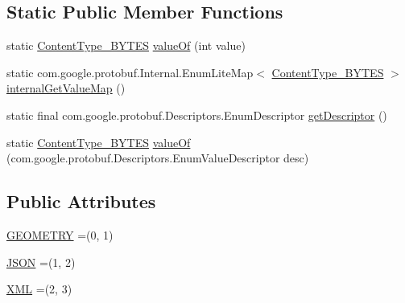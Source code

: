 \subsection*{Static Public Member Functions}
\begin{DoxyCompactItemize}
\item 
static \mbox{\hyperlink{enumcom_1_1mysql_1_1cj_1_1x_1_1protobuf_1_1_mysqlx_resultset_1_1_content_type___b_y_t_e_s}{Content\+Type\+\_\+\+B\+Y\+T\+ES}} \mbox{\hyperlink{enumcom_1_1mysql_1_1cj_1_1x_1_1protobuf_1_1_mysqlx_resultset_1_1_content_type___b_y_t_e_s_af038bca794f2bdff11aea0b8cc925e75}{value\+Of}} (int value)
\item 
static com.\+google.\+protobuf.\+Internal.\+Enum\+Lite\+Map$<$ \mbox{\hyperlink{enumcom_1_1mysql_1_1cj_1_1x_1_1protobuf_1_1_mysqlx_resultset_1_1_content_type___b_y_t_e_s}{Content\+Type\+\_\+\+B\+Y\+T\+ES}} $>$ \mbox{\hyperlink{enumcom_1_1mysql_1_1cj_1_1x_1_1protobuf_1_1_mysqlx_resultset_1_1_content_type___b_y_t_e_s_afd9ec08687cc30b3162eea70faeea54e}{internal\+Get\+Value\+Map}} ()
\item 
static final com.\+google.\+protobuf.\+Descriptors.\+Enum\+Descriptor \mbox{\hyperlink{enumcom_1_1mysql_1_1cj_1_1x_1_1protobuf_1_1_mysqlx_resultset_1_1_content_type___b_y_t_e_s_a6fb51ec8d254769046b5e081c562aed3}{get\+Descriptor}} ()
\item 
static \mbox{\hyperlink{enumcom_1_1mysql_1_1cj_1_1x_1_1protobuf_1_1_mysqlx_resultset_1_1_content_type___b_y_t_e_s}{Content\+Type\+\_\+\+B\+Y\+T\+ES}} \mbox{\hyperlink{enumcom_1_1mysql_1_1cj_1_1x_1_1protobuf_1_1_mysqlx_resultset_1_1_content_type___b_y_t_e_s_a1835fa3047f486fab6c10b4bfefaa070}{value\+Of}} (com.\+google.\+protobuf.\+Descriptors.\+Enum\+Value\+Descriptor desc)
\end{DoxyCompactItemize}
\subsection*{Public Attributes}
\begin{DoxyCompactItemize}
\item 
\mbox{\hyperlink{enumcom_1_1mysql_1_1cj_1_1x_1_1protobuf_1_1_mysqlx_resultset_1_1_content_type___b_y_t_e_s_a2f05973734af4ee7e389c32aa11c9a90}{G\+E\+O\+M\+E\+T\+RY}} =(0, 1)
\item 
\mbox{\hyperlink{enumcom_1_1mysql_1_1cj_1_1x_1_1protobuf_1_1_mysqlx_resultset_1_1_content_type___b_y_t_e_s_a3568694876b4e121a253985b374f1f88}{J\+S\+ON}} =(1, 2)
\item 
\mbox{\hyperlink{enumcom_1_1mysql_1_1cj_1_1x_1_1protobuf_1_1_mysqlx_resultset_1_1_content_type___b_y_t_e_s_aad070c4b8803fae679a573e2c5088de5}{X\+ML}} =(2, 3)
\end{DoxyCompactItemize}
